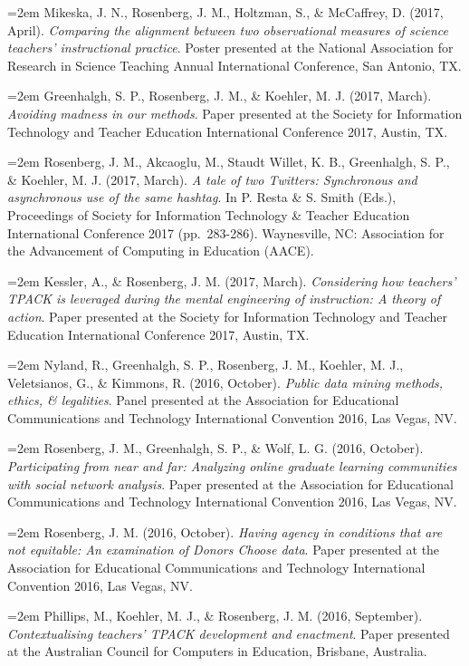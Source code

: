 \documentclass[
  14,
]{article}
\begin{document}
\hangindent=2em Mikeska, J. N., Rosenberg, J. M., Holtzman, S., \&
McCaffrey, D. (2017, April). \emph{Comparing the alignment between two
observational measures of science teachers' instructional practice}.
Poster presented at the National Association for Research in Science
Teaching Annual International Conference, San Antonio, TX.

\hangindent=2em Greenhalgh, S. P., Rosenberg, J. M., \& Koehler, M. J.
(2017, March). \emph{Avoiding madness in our methods}. Paper presented
at the Society for Information Technology and Teacher Education
International Conference 2017, Austin, TX.

\hangindent=2em Rosenberg, J. M., Akcaoglu, M., Staudt Willet, K. B.,
Greenhalgh, S. P., \& Koehler, M. J. (2017, March). \emph{A tale of two
Twitters: Synchronous and asynchronous use of the same hashtag}. In P.
Resta \& S. Smith (Eds.), Proceedings of Society for Information
Technology \& Teacher Education International Conference 2017
(pp.~283-286). Waynesville, NC: Association for the Advancement of
Computing in Education (AACE).

\hangindent=2em Kessler, A., \& Rosenberg, J. M. (2017, March).
\emph{Considering how teachers' TPACK is leveraged during the mental
engineering of instruction: A theory of action}. Paper presented at the
Society for Information Technology and Teacher Education International
Conference 2017, Austin, TX.

\hangindent=2em Nyland, R., Greenhalgh, S. P., Rosenberg, J. M.,
Koehler, M. J., Veletsianos, G., \& Kimmons, R. (2016, October).
\emph{Public data mining methods, ethics, \& legalities}. Panel
presented at the Association for Educational Communications and
Technology International Convention 2016, Las Vegas, NV.

\hangindent=2em Rosenberg, J. M., Greenhalgh, S. P., \& Wolf, L. G.
(2016, October). \emph{Participating from near and far: Analyzing online
graduate learning communities with social network analysis}. Paper
presented at the Association for Educational Communications and
Technology International Convention 2016, Las Vegas, NV.

\hangindent=2em Rosenberg, J. M. (2016, October). \emph{Having agency in
conditions that are not equitable: An examination of Donors Choose
data}. Paper presented at the Association for Educational Communications
and Technology International Convention 2016, Las Vegas, NV.

\hangindent=2em Phillips, M., Koehler, M. J., \& Rosenberg, J. M. (2016,
September). \emph{Contextualising teachers' TPACK development and
enactment}. Paper presented at the Australian Council for Computers in
Education, Brisbane, Australia.
\end{document}
